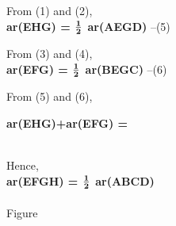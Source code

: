 \documentclass[a4paper,12pt]{report}
\begin{document}
\begin{multicols}{2}
\raggedright\large{From (1) and (2),}\vspace{2mm}\\
\centering\normalsize\textbf{ar(EHG) =  $\frac{\normalsize\textbf 1}{\normalsize\textbf 2}$ ar(AEGD)} --(5)\vspace{2mm}\\

\raggedright\large{From (3) and (4),}\vspace{2mm}\\
\centering\normalsize\textbf{ar(EFG) =  $\frac{\normalsize\textbf 1}{\normalsize\textbf 2}$ ar(BEGC)} --(6)\vspace{10mm}\\

\raggedright\large{From (5) and (6),}\vspace{2mm}\\
\raggedright\normalsize\textbf{ar(EHG)+ar(EFG) = \\ }\vspace{2mm}\\
\raggedright\large{Hence,}\vspace{2mm}\\
\centering\normalsize\textbf{ar(EFGH) = $\frac{\normalsize\textbf 1}{\normalsize\textbf 2}$ ar(ABCD)}\vspace{5mm}\\


\vspace{2mm}\\
\centering\normalsize{Figure}\vspace{5mm}\\



\end{multicols}
\end{document}
